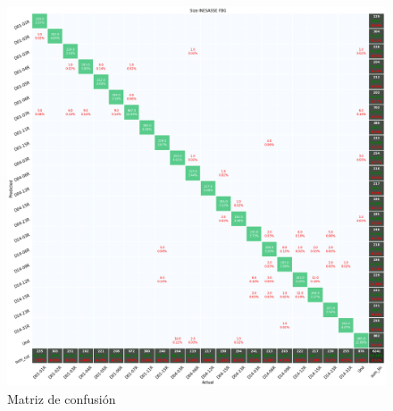 \begin{itemize}
    \begin{figure}[h!]
        \centering
        \includegraphics[width=150mm]{3/Fotos/Ty_Si_INESASSE_confusion.png}
        \captionsetup{justification=centering,margin=1.25cm}
        \caption{Matriz de confusión}
        \label{def_h}
    \end{figure} 
    
\end{itemize}





    
    
